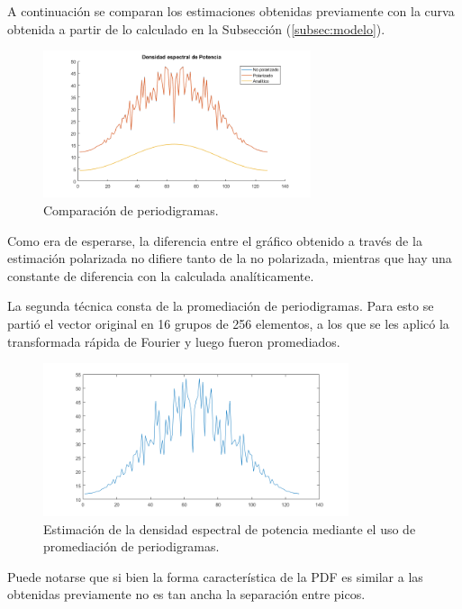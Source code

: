 A continuación se comparan los estimaciones obtenidas previamente con la curva obtenida a partir de lo calculado en la Subsección (\ref{subsec:modelo}).
\begin{figure}[H]
\centering
	\includegraphics[width=0.7\textwidth, trim = {0 0 0 0.725cm},clip]{./ImagenesEjercicio2/densidadPot.png}
	\caption{Comparación de periodigramas.}
	\label{fig:densidadPot}
\end{figure}

Como era de esperarse, la diferencia entre el gráfico obtenido a través de la estimación polarizada no difiere tanto de la no polarizada, mientras que hay una constante de diferencia con la calculada analíticamente.

La segunda técnica consta de la promediación de periodigramas. Para esto se partió el vector original en 16 grupos de 256 elementos, a los que se les aplicó la transformada rápida de Fourier y luego fueron promediados.
\begin{figure}[H]
\centering
	\includegraphics[width=0.8\textwidth, trim = {0 0 0 0.725cm},clip]{./ImagenesEjercicio2/period-calc.png}
	\caption{Estimación de la densidad espectral de potencia mediante el uso de promediación de periodigramas.}
	\label{fig:fft-calc}
\end{figure}

Puede notarse que si bien la forma característica de la PDF es similar a las obtenidas previamente no es tan ancha la separación entre picos.



